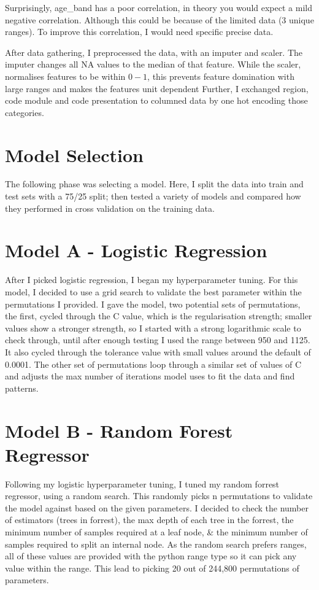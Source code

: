 \documentclass[11pt, a4paper, twocolumn]{article}
\begin{document}
Surprisingly, age\_band has a poor correlation, in theory you would expect a mild negative correlation. Although this could be because of the limited data (3 unique ranges). To improve this correlation, I would need specific precise data.


After data gathering, I preprocessed the data, with an imputer and scaler. The imputer changes all NA values to the median of that feature. 
While the scaler, normalises features to be within $0-1$, this prevents feature domination with large ranges and makes the features unit dependent
Further, I exchanged region, code module and code presentation to columned data by one hot encoding those categories.

\section{Model Selection}

The following phase was selecting a model. Here, I split the data into train and test sets with a 75/25 split; then tested a variety of models and compared how they performed in cross validation on the training data.



\section{Model A - Logistic Regression}

After I picked logistic regression, I began my hyperparameter tuning. For this model, I decided to use a grid search to validate the best parameter within the permutations I provided. 
I gave the model, two potential sets of permutations, the first, cycled through the C value, which is the regularisation strength; smaller values show a stronger strength, 
so I started with a strong logarithmic scale to check through, until after enough testing I used the range between 950 and 1125. It also cycled through the tolerance value with small values around the default of 0.0001.
The other set of permutations loop through a similar set of values of C and adjusts the max number of iterations model uses to fit the data and find patterns.

\section{Model B - Random Forest Regressor}

Following my logistic hyperparameter tuning, I tuned my random forrest regressor, using a random search. This randomly picks n permutations to validate the model against based on the given parameters.
I decided to check the number of estimators (trees in forrest), the max depth of each tree in the forrest, the minimum number of samples required at a leaf node, \& the minimum number of samples required to split an internal node.
As the random search prefers ranges, all of these values are provided with the python range type so it can pick any value within the range. This lead to picking 20 out of 244,800 permutations of parameters.
\end{document}
